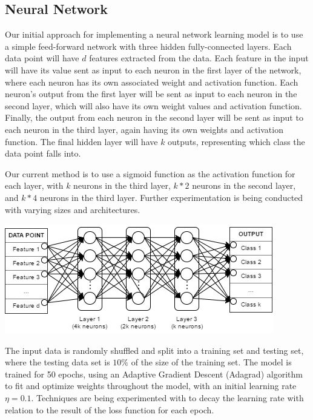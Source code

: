\documentclass[10pt]{article}
\begin{document}
\begin{multicols}{2}
		\subsection{Neural Network}
		\par
		Our initial approach for implementing a neural network learning model is to use a simple feed-forward network with three hidden fully-connected layers. Each data point will have \(d\) features extracted from the data. Each feature in the input will have its value sent as input to each neuron in the first layer of the network, where each neuron has its own associated weight and activation function. Each neuron's output from the first layer will be sent as input to each neuron in the second layer, which will also have its own weight values and activation function. Finally, the output from each neuron in the second layer will be sent as input to each neuron in the third layer, again having its own weights and activation function. The final hidden layer will have \(k\) outputs, representing which class the data point falls into.
		\par
		Our current method is to use a sigmoid function as the activation function for each layer, with \(k\) neurons in the third layer, \(k*2\) neurons in the second layer, and \(k*4\) neurons in the third layer. Further experimentation is being conducted with varying sizes and architectures.
		\begin{center}
            \captionsetup{type=figure}
			\includegraphics[scale=0.5]{NeuralNet/Network} \\
			\label{fig:nn_10_class_results}
		\end{center}
		The input data is randomly shuffled and split into a training  set and testing set, where the testing data set is \(10\%\) of the size of the training set.
		The model is trained for 50 epochs, using an Adaptive Gradient Descent (Adagrad) algorithm to fit and optimize weights throughout the model, with an initial learning rate \(\eta = 0.1\). Techniques are being experimented with to decay the learning rate with relation to the result of the loss function for each epoch.

\end{multicols}
\end{document}
